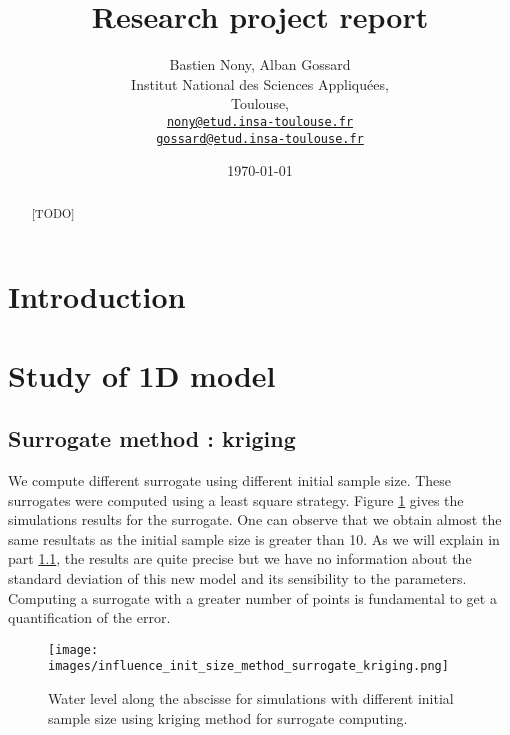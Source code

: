 \documentclass[hidelinks,12pt]{article}
\begin{document}
\title{Research project report}
\author{Bastien Nony, Alban Gossard\\
   Institut National des Sciences Appliquées,\\
   Toulouse,\\
   \href{mailto:nony@etud.insa-toulouse.fr}{   \texttt{nony@etud.insa-toulouse.fr}}\\
   \href{mailto:gossard@etud.insa-toulouse.fr}{   \texttt{gossard@etud.insa-toulouse.fr}}}
\date{\today}

\maketitle

\begin{abstract}
  [TODO]
\end{abstract}

\tableofcontents


\section*{Introduction}



\section{Study of 1D model}

\subsection{Surrogate method : kriging}

We compute different surrogate using different initial sample size. These surrogates were computed using a least square strategy. Figure \ref{influence_init_size_method_surrogate_kriging} gives the simulations results for the surrogate. One can observe that we obtain almost the same resultats as the initial sample size is greater than 10. As we will explain in part \ref{}, the results are quite precise but we have no information about the standard deviation of this new model and its sensibility to the parameters. Computing a surrogate with a greater number of points is fundamental to get a quantification of the error.

\begin{figure}[!t]
  \centering
  \texttt{[image: images/influence\_init\_size\_method\_surrogate\_kriging.png]}
  \caption{Water level along the abscisse for simulations with different initial sample size using kriging method for surrogate computing.}
  	\label{influence_init_size_method_surrogate_kriging}
\end{figure}
\end{document}
